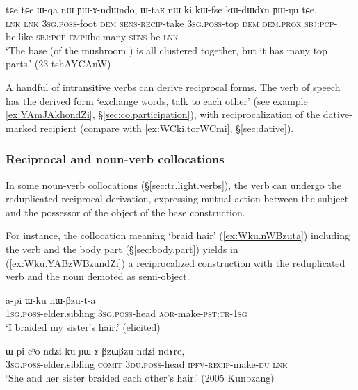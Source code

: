 \begin{exe}
\ex \label{ex:Wqa.YAndWndo}
\gll tɕe tɕe ɯ-qa nɯ ɲɯ-ɤ-ndɯ\redp{}ndo, ɯ-taʁ nɯ ki kɯ-fse kɯ-dɯ\redp{}dɤn ɲɯ-ŋu tɕe, \\
 \textsc{lnk} \textsc{lnk} \textsc{3sg}.\textsc{poss}-foot \textsc{dem} \textsc{sens}-\textsc{recip}-take \textsc{3sg}.\textsc{poss}-top \textsc{dem} \textsc{dem}.\textsc{prox} \textsc{sbj}:\textsc{pcp}-be.like \textsc{sbj}:\textsc{pcp}-\textsc{emph}\redp{}be.many \textsc{sens}-be \textsc{lnk} \\
\glt `The base (of the mushroom ) is all clustered together, but it has many top parts.' (23-tshAYCAnW)
\end{exe}

A handful of intransitive verbs can derive reciprocal forms. The verb of speech  has the derived form  `exchange words, talk to each other' (see example \ref{ex:YAmJAkhondZi}, §\ref{sec:co.participation}), with reciprocalization of the dative-marked recipient (compare with \ref{ex:WCki.torWCmi}, §\ref{sec:dative}).

\subsubsection{Reciprocal and noun-verb collocations} \label{sec:reciprocal.collocation}
In some noun-verb collocations (§\ref{sec:tr.light.verbs}), the verb can undergo the reduplicated reciprocal derivation, expressing mutual action between the subject and the possessor of the object of the base construction.

For instance, the collocation meaning `braid hair' (\ref{ex:Wku.nWBzuta}) including the verb  and the body part  (§\ref{sec:body.part}) yields in (\ref{ex:Wku.YABzWBzundZi}) a reciprocalized construction with the reduplicated verb  and the noun  demoted as semi-object.

\begin{exe}
\ex \label{ex:Wku.nWBzuta}
\gll  a-pi ɯ-ku nɯ-βzu-t-a \\
\textsc{1sg}.\textsc{poss}-elder.sibling \textsc{3sg}.\textsc{poss}-head \textsc{aor}-make-\textsc{pst}:\textsc{tr}-\textsc{1sg} \\
\glt `I braided my sister's hair.' (elicited)
\end{exe}

\begin{exe}
\ex \label{ex:Wku.YABzWBzundZi}
\gll ɯ-pi cʰo ndʑi-ku ɲɯ-ɤ-βzɯ\redp{}βzu-ndʑi ndɤre, \\
\textsc{3sg}.\textsc{poss}-elder.sibling \textsc{comit} \textsc{3du}.\textsc{poss}-head \textsc{ipfv}-\textsc{recip}-make-\textsc{du} \textsc{lnk} \\
\glt `She and her sister braided each other's hair.' (2005 Kunbzang)
\end{exe}

